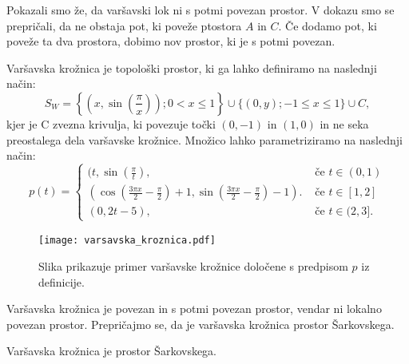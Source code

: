 \documentclass[../TG_magistrsko_delo_sections.tex]{subfiles}
\begin{document}
Pokazali smo že, da varšavski lok ni s potmi povezan prostor. V dokazu smo se prepričali, da ne obstaja pot, ki poveže ptostora $A$ in $C$. Če dodamo pot, ki poveže ta dva prostora, dobimo nov prostor, ki je s potmi povezan.


\begin{definicija}\label{def:vk}
Varšavska krožnica je topološki prostor, ki ga lahko definiramo na naslednji način:
$$S_W = \left\{\left(x, \sin\left(\frac{\pi}{x}\right)\right); 0 < x \leq 1\right\} \cup \{(0, y); -1 \leq x \leq 1\} \cup C,$$
kjer je C zvezna krivulja, ki povezuje točki $(0,-1)$ in $(1,0)$ in ne seka preostalega dela varšavske krožnice.
Množico lahko parametriziramo na naslednji način:
\[ p(t) = \begin{cases}
  (t, \sin(\frac{\pi}{t}), & \mbox{ če $t \in (0, 1) $}\\
 (\cos(\frac{3\pi x}{2}-\frac{\pi}{2})+1, \sin(\frac{3\pi x}{2}-\frac{\pi}{2})-1). & \mbox{ če $t \in [1, 2]$}\\
  (0, 2t-5), & \mbox{ če $t \in (2, 3]$.}
  \end{cases}
  \]
\end{definicija}

\begin{figure}[h]
  \centering
  \texttt{[image: varsavska\_kroznica.pdf]}
  \caption[Varšavska krožnica]{Slika prikazuje primer varšavske krožnice določene s predpisom $p$ iz definicije.}
  \label{fig:varsavska-kroznica}
\end{figure}

Varšavska krožnica je povezan in s potmi povezan prostor, vendar ni lokalno povezan prostor. Prepričajmo se, da je varšavska krožnica prostor Šarkovskega.

\begin{trditev} \label{trd:vk je prostor š}
Varšavska krožnica je prostor Šarkovskega.
\end{trditev}

\end{document}
